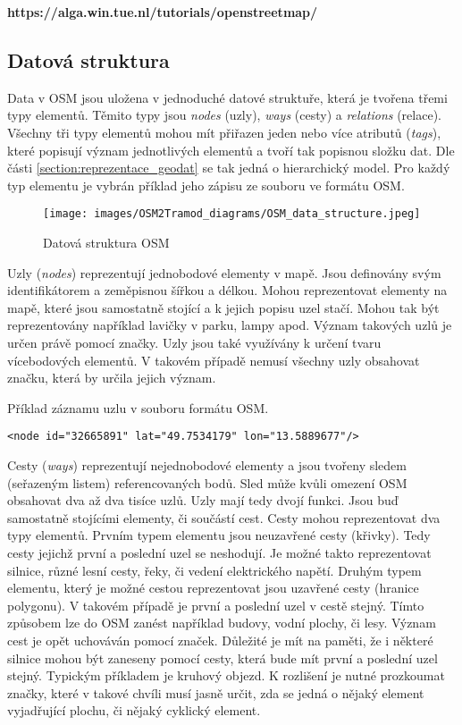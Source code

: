 \textbf{https://alga.win.tue.nl/tutorials/openstreetmap/}

\subsection{Datová struktura}
\label{datova_struktura_osm}

Data v OSM jsou uložena v jednoduché datové struktuře, která je tvořena třemi typy elementů. Těmito typy jsou \textit{nodes} (uzly), \textit{ways} (cesty) a \textit{relations} (relace). Všechny tři typy elementů mohou mít přiřazen jeden nebo více atributů (\textit{tags}), které popisují význam jednotlivých elementů a tvoří tak popisnou složku dat. Dle části \ref{section:reprezentace_geodat} se tak jedná o hierarchický model. Pro každý typ elementu je vybrán příklad jeho zápisu ze souboru ve formátu OSM. 


\begin{figure}[htbp]
\centering
\texttt{[image: images/OSM2Tramod\_diagrams/OSM\_data\_structure.jpeg]}
\caption{Datová struktura OSM}
\label{OSM_datova_struktura}
\end{figure}

Uzly (\textit{nodes}) reprezentují jednobodové elementy v mapě. Jsou definovány svým identifikátorem a zeměpisnou šířkou a délkou. Mohou reprezentovat elementy na mapě, které jsou samostatně stojící a k jejich popisu uzel stačí. Mohou tak být reprezentovány například lavičky v parku, lampy apod. Význam takových uzlů je určen právě pomocí značky. Uzly jsou také využívány k určení tvaru vícebodových elementů. V takovém případě nemusí všechny uzly obsahovat značku, která by určila jejich význam.

Příklad záznamu uzlu v souboru formátu OSM. 
\begin{lstlisting}
<node id="32665891" lat="49.7534179" lon="13.5889677"/>
\end{lstlisting}

Cesty (\textit{ways}) reprezentují nejednobodové elementy a jsou tvořeny sledem (seřazeným listem) referencovaných bodů. Sled může kvůli omezení OSM obsahovat dva až dva tisíce uzlů. Uzly mají tedy dvojí funkci. Jsou buď samostatně stojícími elementy, či součástí cest. Cesty mohou reprezentovat dva typy elementů. Prvním typem elementu jsou neuzavřené cesty (křivky). Tedy cesty jejichž první a poslední uzel se neshodují. Je možné takto reprezentovat silnice, různé lesní cesty, řeky, či vedení elektrického napětí. Druhým typem elementu, který je možné cestou reprezentovat jsou uzavřené cesty (hranice polygonu). V takovém případě je první a poslední uzel v cestě stejný. Tímto způsobem lze do OSM zanést například budovy, vodní plochy, či lesy. Význam cest je opět uchováván pomocí značek. Důležité je mít na paměti, že i některé silnice mohou být zaneseny pomocí cesty, která bude mít první a poslední uzel stejný. Typickým příkladem je kruhový objezd. K rozlišení je nutné prozkoumat značky, které v takové chvíli musí jasně určit, zda se jedná o nějaký element vyjadřující plochu, či nějaký cyklický element. 


